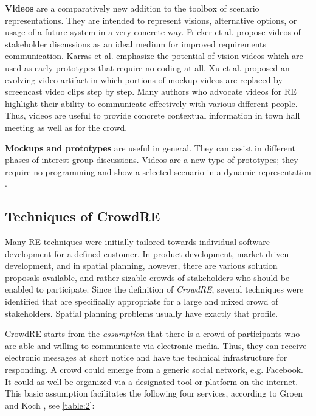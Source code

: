 \documentclass[conference]{IEEEtran}
\begin{document}
\textbf{Videos} are a comparatively new addition to the toolbox of scenario 
representations. They are intended to represent visions, alternative options, 
or usage of a future system in a very concrete way. Fricker et al. 
\cite{Fricker.2015} propose videos of stakeholder discussions as an ideal 
medium for improved requirements communication. Karras et al. 
\cite{Karras.2016b} emphasize the potential of vision videos which are used as 
early prototypes that require no coding at all. Xu et al. \cite{Xu.2012} 
proposed an evolving video artifact in which portions of mockup videos are 
replaced by screencast video clips step by step. Many authors who advocate 
videos for RE highlight their ability to communicate effectively with various 
different people. Thus, videos are useful to provide concrete contextual 
information in town hall meeting as well as for the crowd.

\textbf{Mockups and prototypes} are useful in general. They can assist in 
different phases of interest group discussions. Videos are a new type of 
prototypes; they require no programming and show a selected scenario in a 
dynamic representation \cite{Karras.2017}.

\subsection{Techniques of CrowdRE}
Many RE techniques were initially tailored towards individual software 
development for a defined customer. In product development, market-driven 
development, and in spatial planning, however, there are various solution 
proposals available, and rather sizable crowds of stakeholders who should be 
enabled to participate. Since the definition of \textit{CrowdRE}, several 
techniques were identified that are specifically appropriate for a large and 
mixed crowd of stakeholders. Spatial planning problems usually have exactly 
that profile.

CrowdRE starts from the \textit{assumption} that there is a crowd of 
participants who are able and willing to communicate via electronic media. 
Thus, they can receive electronic messages at short notice and have the 
technical infrastructure for responding. A crowd could emerge from a generic 
social network, e.g. Facebook. It could as well be organized via a designated 
tool or platform on the internet. This basic assumption facilitates the 
following four services, according to Groen and Koch \cite{Groen.}, see 
\tablename{ \ref{table:2}}:
\end{document}
